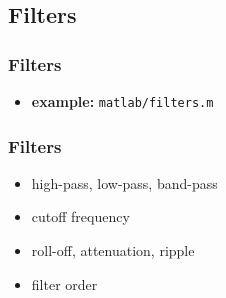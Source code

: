 
\subsection{Filters}

\begin{frame}
	\frametitle{Filters}
	\begin{itemize}
		\item \textbf{example:} \texttt{matlab/filters.m}
			\begin{figure}
				\centering
				\begin{subfigure}[c]{0.48\linewidth}
				\end{subfigure}
				\hspace{0.01\linewidth}
				\begin{subfigure}[c]{0.48\linewidth}
				\end{subfigure}
			\end{figure}
	\end{itemize}
\end{frame}

\begin{frame}
	\frametitle{Filters}
	\begin{itemize}
		\item high-pass, low-pass, band-pass
		\item cutoff frequency
		\item roll-off, attenuation, ripple
		\item filter order
	\end{itemize}
\end{frame}

